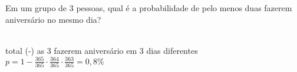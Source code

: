 \begin{ex}
Em um grupo de 3 pessoas, qual é a probabilidade de pelo menos duas fazerem aniversário no mesmo dia?
  \begin{sol}
    \phantom{A} \\
    total (-) as 3 fazerem aniversário em 3 dias diferentes \\
    $p=1-\frac{365}{365}\cdot\frac{364}{365}\cdot\frac{363}{365}=0,8\%$
  \end{sol}
\end{ex}